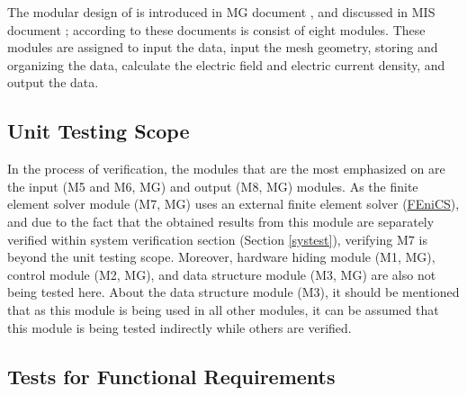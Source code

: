 \documentclass[12pt, titlepage]{article}
\begin{document}

The modular design of \progname{} is introduced in MG document \citep{MGSPDFMdoc74:online}, and discussed in MIS document \citep{MISSPDFMdoc81:online}; according to these documents \progname{} is consist of eight modules. These modules are assigned to input the data, input the mesh geometry, storing and organizing the data, calculate the electric field and electric current density, and output the data. 

\subsection{Unit Testing Scope}


In the process of \progname{} verification, the modules that are the most emphasized on are the input (M5 and M6, MG) and output (M8, MG) modules. As the finite element solver module (M7, MG) uses an external finite element solver (\href{www.fenics.org}{FEniCS}), and due to the fact that the obtained results from this module are separately verified within system verification section (Section \ref{systest}), verifying M7 is beyond the unit testing scope. Moreover, hardware hiding module (M1, MG), \progname{} control module (M2, MG), and data structure module (M3, MG) are also not being tested here. About the data structure module (M3), it should be mentioned that as this module is being used in all other modules, it can be assumed that this module is being tested indirectly while others are verified.


\subsection{Tests for Functional Requirements}

\end{document}
